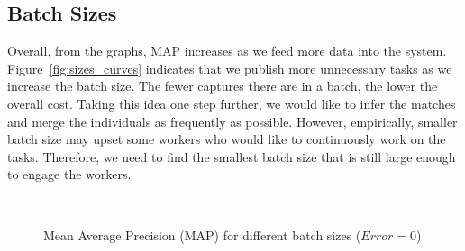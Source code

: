 \subsection{Batch Sizes} %
\label{sub:batch_sizes_res}

Overall, from the graphs, MAP increases as we feed more data into the system.
Figure~\ref{fig:sizes_curves} indicates that we publish more unnecessary
tasks as we increase the batch size. The fewer captures there are in a batch,
the lower the overall cost. Taking this idea one step further, we would like to
infer the matches and merge the individuals as frequently as possible. However,
empirically, smaller batch size may upset some workers who would like to
continuously work on the tasks. Therefore, we need to find the smallest batch
size that is still large enough to engage the workers.

\begin{figure}[h!]
  \centering
  \\
  \captionsetup{justification=centering}
  \caption{Mean Average Precision (MAP) for different batch sizes ($Error=0$)}
\end{figure}


